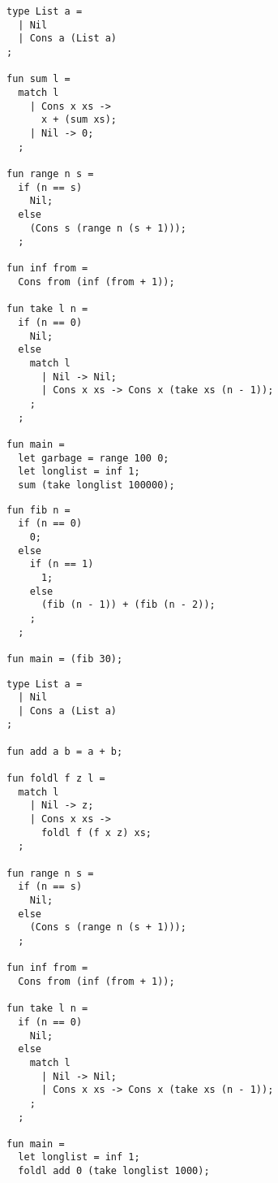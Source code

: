 
\begin{figure}
\begin{lstlisting}[breaklines=true,caption={A program that sums a list of 100000 increasing integers},label=lst:appedix:intsum]
type List a = 
  | Nil
  | Cons a (List a)
;

fun sum l =
  match l
    | Cons x xs ->
      x + (sum xs);
    | Nil -> 0;
  ;

fun range n s =
  if (n == s) 
    Nil;
  else
    (Cons s (range n (s + 1)));
  ;

fun inf from =
  Cons from (inf (from + 1));

fun take l n =
  if (n == 0) 
    Nil;
  else
    match l
      | Nil -> Nil;
      | Cons x xs -> Cons x (take xs (n - 1));
    ;
  ;

fun main =
  let garbage = range 100 0;
  let longlist = inf 1;
  sum (take longlist 100000);
\end{lstlisting}
\end{figure}
\begin{figure}
\begin{lstlisting}[breaklines=true,caption={A program which calculates the Fibonacci numbers recursively},label=lst:appedix:fib]
fun fib n = 
  if (n == 0)
    0;
  else
    if (n == 1)
      1;
    else
      (fib (n - 1)) + (fib (n - 2));
    ;
  ;

fun main = (fib 30);
\end{lstlisting}
\end{figure}
\begin{figure}
\begin{lstlisting}[breaklines=true,caption={foldl},label=lst:appendix:foldl]
type List a = 
  | Nil
  | Cons a (List a)
;

fun add a b = a + b;

fun foldl f z l =
  match l
    | Nil -> z;
    | Cons x xs ->
      foldl f (f x z) xs;
  ;

fun range n s =
  if (n == s) 
    Nil;
  else
    (Cons s (range n (s + 1)));
  ;

fun inf from =
  Cons from (inf (from + 1));

fun take l n =
  if (n == 0) 
    Nil;
  else
    match l
      | Nil -> Nil;
      | Cons x xs -> Cons x (take xs (n - 1));
    ;
  ;

fun main =
  let longlist = inf 1;
  foldl add 0 (take longlist 1000);

\end{lstlisting}
\end{figure}
